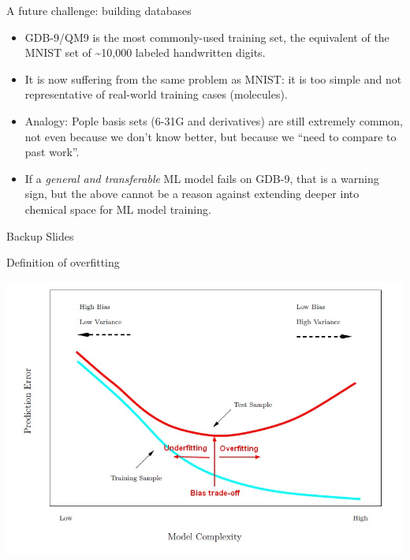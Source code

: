 \documentclass[xetex,compress]{beamer}
\begin{document}
\begin{frame}{A future challenge: building databases}
  \begin{itemize}
  \item GDB-9/QM9 is the most commonly-used training set, the equivalent of the MNIST set of \textasciitilde{}10,000 labeled handwritten digits.
  \item It is now suffering from the same problem as MNIST: it is too simple and not representative of real-world training cases (molecules).
  \item Analogy: Pople basis sets (6-31G and derivatives) are still extremely common, not even because we don't know better, but because we ``need to compare to past work''.
  \item If a \emph{general and transferable} ML model fails on GDB-9, that is a warning sign, but the above cannot be a reason against extending deeper into chemical space for ML model training.
  \end{itemize}
\end{frame}

\begin{frame}{Backup Slides}
\end{frame}

\begin{frame}{Definition of overfitting}
  \begin{center}
    \includegraphics[width=1.00\textwidth]{./figures/model_complexity_error_training_test.jpg}
  \end{center}
\end{frame}
\end{document}
